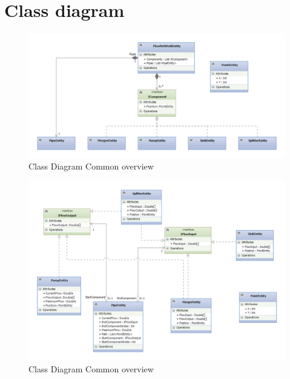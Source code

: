 \chapter{Class diagram}
\begin{figure}
	\centering
	\includegraphics[width=\textwidth]{figures/ClassCommonOverall.pdf}
	\caption{Class Diagram Common overview}
	\label{fig:commonoverview}
\end{figure}

\begin{figure}
	\centering
	\includegraphics[width=\textwidth]{figures/ClassCommonComponents.pdf}
	\caption{Class Diagram Common overview}
	\label{fig:classcomponents}
\end{figure}